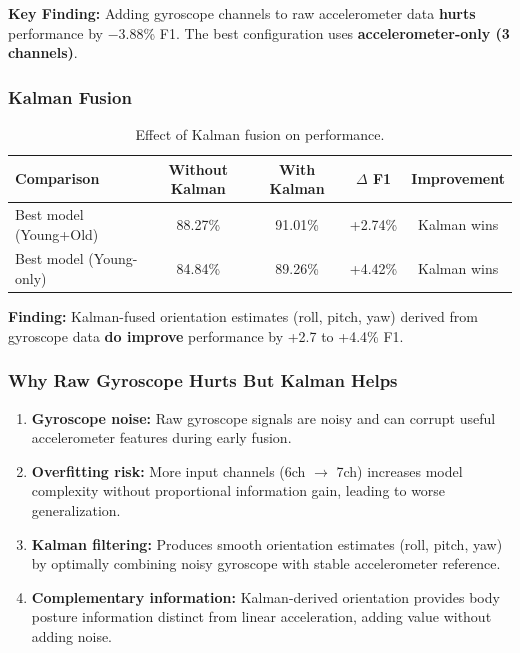 \documentclass{article}
\begin{document}
\textbf{Key Finding:} Adding gyroscope channels to raw accelerometer data \textbf{hurts} performance by $-$3.88\% F1. The best configuration uses \textbf{accelerometer-only (3 channels)}.

\subsubsection{Kalman Fusion}

\begin{table}[htbp]
    \centering
    \caption{Effect of Kalman fusion on performance.}
    \label{tab:rq2_kalman}
    \begin{tabular}{lcccc}
        \toprule
        \textbf{Comparison} & \textbf{Without Kalman} & \textbf{With Kalman} & \textbf{$\Delta$ F1} & \textbf{Improvement} \\
        \midrule
        Best model (Young+Old) & 88.27\% & 91.01\% & +2.74\% & Kalman wins \\
        Best model (Young-only) & 84.84\% & 89.26\% & +4.42\% & Kalman wins \\
        \bottomrule
    \end{tabular}
\end{table}

\textbf{Finding:} Kalman-fused orientation estimates (roll, pitch, yaw) derived from gyroscope data \textbf{do improve} performance by +2.7 to +4.4\% F1.

\subsubsection{Why Raw Gyroscope Hurts But Kalman Helps}

\begin{enumerate}
    \item \textbf{Gyroscope noise:} Raw gyroscope signals are noisy and can corrupt useful accelerometer features during early fusion.
    \item \textbf{Overfitting risk:} More input channels (6ch $\rightarrow$ 7ch) increases model complexity without proportional information gain, leading to worse generalization.
    \item \textbf{Kalman filtering:} Produces smooth orientation estimates (roll, pitch, yaw) by optimally combining noisy gyroscope with stable accelerometer reference.
    \item \textbf{Complementary information:} Kalman-derived orientation provides body posture information distinct from linear acceleration, adding value without adding noise.
\end{enumerate}
\end{document}
